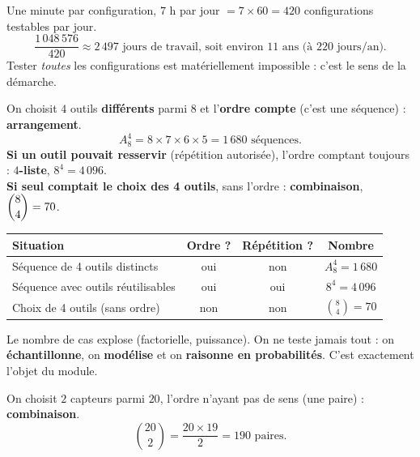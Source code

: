 \documentclass[a4paper,11pt]{article}
\begin{document}
\begin{correction}
Une minute par configuration, $7$ h par jour $= 7\times 60 = 420$ configurations testables par jour.
\[
\frac{1\,048\,576}{420} \approx 2\,497 \text{ jours de travail, soit environ } 11 \text{ ans (à } 220 \text{ jours/an).}
\]
Tester \emph{toutes} les configurations est matériellement impossible : c'est le sens de la démarche.
\end{correction}

\begin{correction}
On choisit $4$ outils \textbf{différents} parmi $8$ et l'\textbf{ordre compte} (c'est une séquence) : \textbf{arrangement}.
\[
A_8^4 = 8\times 7\times 6\times 5 = 1\,680 \text{ séquences.}
\]
\textbf{Si un outil pouvait resservir} (répétition autorisée), l'ordre comptant toujours : \textbf{$4$-liste}, $8^4 = 4\,096$. \\
\textbf{Si seul comptait le choix des 4 outils}, sans l'ordre : \textbf{combinaison}, $\dbinom{8}{4} = 70$.
\begin{center}
\renewcommand{\arraystretch}{1.4}
\begin{tabular}{|l|c|c|c|}
\hline
\rowcolor{uimmlightblue}
\textbf{Situation} & \textbf{Ordre ?} & \textbf{Répétition ?} & \textbf{Nombre} \\
\hline
Séquence de 4 outils distincts & oui & non & $A_8^4 = 1\,680$ \\
\hline
Séquence avec outils réutilisables & oui & oui & $8^4 = 4\,096$ \\
\hline
Choix de 4 outils (sans ordre) & non & non & $\binom{8}{4} = 70$ \\
\hline
\end{tabular}
\end{center}
\end{correction}

\begin{correction}[-- Q5 : conclusion]
Le nombre de cas explose (factorielle, puissance). On ne teste jamais tout : on \textbf{échantillonne}, on \textbf{modélise} et on \textbf{raisonne en probabilités}. C'est exactement l'objet du module.
\end{correction}

\begin{correction}
On choisit $2$ capteurs parmi $20$, l'ordre n'ayant pas de sens (une paire) : \textbf{combinaison}.
\[
\binom{20}{2} = \frac{20\times 19}{2} = 190 \text{ paires.}
\]
\end{correction}
\end{document}
